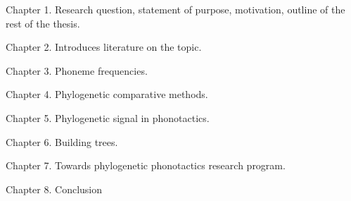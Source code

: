 Chapter 1. Research question, statement of purpose, motivation, outline of the rest of the thesis.

Chapter 2. Introduces literature on the topic.

Chapter 3. Phoneme frequencies.

Chapter 4. Phylogenetic comparative methods.

Chapter 5. Phylogenetic signal in phonotactics.

Chapter 6. Building trees.

Chapter 7. Towards phylogenetic phonotactics research program.

Chapter 8. Conclusion



%